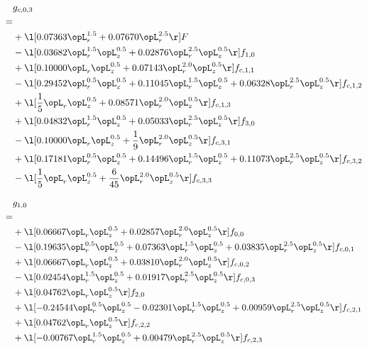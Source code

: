 \begin{alignat}{2} 
\label{eq:g_03_0} 
& g_{c,0,3} \nonumber \\ 
 = \\ 
& + \l[  0.07363 \opL_r^{1.5} +  0.07670 \opL_r^{2.5}  \r] F \nonumber \\ 
& - \l[  0.03682 \opL_r^{1.5} \opL_z^{0.5} +  0.02876 \opL_r^{2.5} \opL_z^{0.5}  \r] f_{1,0} \nonumber \\ 
& + \l[  0.10000 \opL_r \opL_z^{0.5} +  0.07143 \opL_r^{2.0} \opL_z^{0.5}  \r] f_{c,1,1} \nonumber \\ 
& - \l[  0.29452 \opL_r^{0.5} \opL_z^{0.5} +  0.11045 \opL_r^{1.5} \opL_z^{0.5} +  0.06328 \opL_r^{2.5} \opL_z^{0.5}  \r] f_{c,1,2} \nonumber \\ 
& + \l[ \frac{1}{5} \opL_r \opL_z^{0.5} +  0.08571 \opL_r^{2.0} \opL_z^{0.5}  \r] f_{c,1,3} \nonumber \\ 
& + \l[  0.04832 \opL_r^{1.5} \opL_z^{0.5} +  0.05033 \opL_r^{2.5} \opL_z^{0.5}  \r] f_{3,0} \nonumber \\ 
& - \l[  0.10000 \opL_r \opL_z^{0.5} + \frac{1}{9} \opL_r^{2.0} \opL_z^{0.5}  \r] f_{c,3,1} \nonumber \\ 
& + \l[  0.17181 \opL_r^{0.5} \opL_z^{0.5} +  0.14496 \opL_r^{1.5} \opL_z^{0.5} +  0.11073 \opL_r^{2.5} \opL_z^{0.5}  \r] f_{c,3,2} \nonumber \\ 
& - \l[ \frac{1}{5} \opL_r \opL_z^{0.5} + \frac{6}{45} \opL_r^{2.0} \opL_z^{0.5}  \r] f_{c,3,3} \nonumber \\ 
\end{alignat} 


\begin{alignat}{2} 
\label{eq:g_10_0} 
& g_{1,0} \nonumber \\ 
 = \\ 
& + \l[  0.06667 \opL_r \opL_z^{0.5} +  0.02857 \opL_r^{2.0} \opL_z^{0.5}  \r] f_{0,0} \nonumber \\ 
& - \l[  0.19635 \opL_r^{0.5} \opL_z^{0.5} +  0.07363 \opL_r^{1.5} \opL_z^{0.5} +  0.03835 \opL_r^{2.5} \opL_z^{0.5}  \r] f_{c,0,1} \nonumber \\ 
& + \l[  0.06667 \opL_r \opL_z^{0.5} +  0.03810 \opL_r^{2.0} \opL_z^{0.5}  \r] f_{c,0,2} \nonumber \\ 
& - \l[  0.02454 \opL_r^{1.5} \opL_z^{0.5} +  0.01917 \opL_r^{2.5} \opL_z^{0.5}  \r] f_{c,0,3} \nonumber \\ 
& + \l[  0.04762 \opL_r \opL_z^{0.5}  \r] f_{2,0} \nonumber \\ 
& + \l[  -0.24544 \opL_r^{0.5} \opL_z^{0.5}   -0.02301 \opL_r^{1.5} \opL_z^{0.5} +  0.00959 \opL_r^{2.5} \opL_z^{0.5}  \r] f_{c,2,1} \nonumber \\ 
& + \l[  0.04762 \opL_r \opL_z^{0.5}  \r] f_{c,2,2} \nonumber \\ 
& + \l[  -0.00767 \opL_r^{1.5} \opL_z^{0.5} +  0.00479 \opL_r^{2.5} \opL_z^{0.5}  \r] f_{c,2,3} \nonumber \\ 
\end{alignat} 


